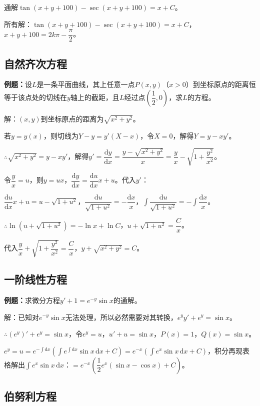 \documentclass[UTF8, 12pt]{ctexart}
\begin{document}
通解$\tan(x+y+100)-\sec(x+y+100)=x+C$。

所有解：$\tan(x+y+100)-\sec(x+y+100)=x+C$，$x+y+100=2k\pi-\dfrac{\pi}{2}$。

\subsection{自然齐次方程}

\textbf{例题：}设$L$是一条平面曲线，其上任意一点$P(x,y)$（$x>0$）到坐标原点的距离恒等于该点处的切线在$y$轴上的截距，且$L$经过点$\left(\dfrac{1}{2},0\right)$，求$L$的方程。

解：$(x,y)$到坐标原点的距离为$\sqrt{x^2+y^2}$。

若$y=y(x)$，则切线为$Y-y=y'(X-x)$，令$X=0$，解得$Y=y-xy'$。

$\therefore\sqrt{x^2+y^2}=y-xy'$，解得$y'=\dfrac{\textrm{d}y}{\textrm{d}x}=\dfrac{y-\sqrt{x^2+y^2}}{x}=\dfrac{y}{x}-\sqrt{1+\dfrac{y^2}{x^2}}$。

令$\dfrac{y}{x}=u$，则$y=ux$，$\dfrac{\textrm{d}y}{\textrm{d}x}=\dfrac{\textrm{d}u}{\textrm{d}x}x+u$。代入$y'$：

$\dfrac{\textrm{d}u}{\textrm{d}x}x+u=u-\sqrt{1+u^2}$，$\dfrac{\textrm{d}u}{\sqrt{1+u^2}}=-\dfrac{\textrm{d}x}{x}$，$\displaystyle{\int\dfrac{\textrm{d}u}{\sqrt{1+u^2}}=-\int\dfrac{\textrm{d}x}{x}}$。

$\therefore\ln(u+\sqrt{1+u^2})=-\ln x+\ln C$，$u+\sqrt{1+u^2}=\dfrac{C}{x}$。

代入$\dfrac{y}{x}+\sqrt{1+\dfrac{y^2}{x^2}}=\dfrac{C}{x}$，$y+\sqrt{x^2+y^2}=C$。

\subsection{一阶线性方程}

\textbf{例题：}求微分方程$y'+1=e^{-y}\sin x$的通解。

解：已知对$e^{-y}\sin x$无法处理，所以必然需要对其转换，$e^yy'+e^y=\sin x$。

$\therefore(e^y)'+e^y=\sin x$，令$e^y=u$，$u'+u=\sin x$，$P(x)=1$，$Q(x)=\sin x$。

$e^y=u=e^{-\int\textrm{d}x}(\int e^{\int\textrm{d}x}\sin x\,\textrm{d}x+C)=e^{-x}(\int e^x\sin x\,\textrm{d}x+C)$，积分再现表格解出$\int e^x\sin x\,\textrm{d}x$：$=e^{-x}\left(\dfrac{1}{2}e^x(\sin x-\cos x)+C\right)$。

\subsection{伯努利方程}
\end{document}
